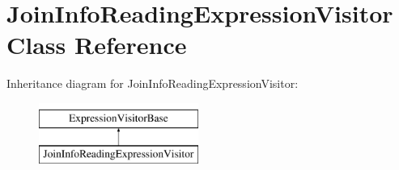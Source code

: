 \hypertarget{class_join_info_reading_expression_visitor}{\section{Join\+Info\+Reading\+Expression\+Visitor Class Reference}
\label{class_join_info_reading_expression_visitor}
}
Inheritance diagram for Join\+Info\+Reading\+Expression\+Visitor\+:\begin{figure}[H]
\begin{center}
\leavevmode
\includegraphics[height=2.000000cm]{class_join_info_reading_expression_visitor}
\end{center}
\end{figure}
